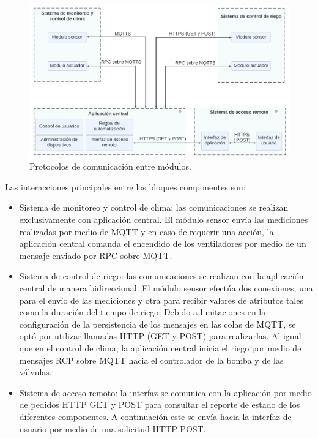 \begin{figure}[h]
	\centering
	\includegraphics[width=1.0\textwidth]{./Figures/blockproto2.jpg}
	\caption[Protocolos de comunicación entre módulos.]{Protocolos de comunicación entre módulos.}
	\label{fig:blockprotos}
\end{figure}


\pagebreak
Las interacciones principales entre los bloques componentes son:
 
 \begin{itemize}
	\item Sistema de monitoreo y control de clima: las comunicaciones se realizan exclusivamente con aplicación central.
	El módulo sensor envía las mediciones realizadas por medio de MQTT y en caso de requerir una acción, la aplicación central comanda el encendido de los ventiladores por medio de un mensaje enviado por RPC \citep{rfc1057} sobre MQTT.
	
	\item Sistema de control de riego: las comunicaciones se realizan con la aplicación central de manera bidireccional.
	El módulo sensor efectúa dos conexiones, una para el envío de las mediciones y otra para recibir valores de atributos tales como la duración del tiempo de riego. Debido a limitaciones en la configuración de la persistencia de los mensajes en las colas de MQTT, se optó por utilizar llamadas HTTP (GET y POST) para realizarlas.
	Al igual que en el control de clima, la aplicación central inicia el riego por medio de mensajes RCP sobre MQTT hacia el controlador de la bomba y de las válvulas.
	
	\item Sistema de acceso remoto: la interfaz se comunica con la aplicación por medio de pedidos HTTP GET y POST para consultar el reporte de estado de los diferentes componentes. A continuación este se envía hacia la interfaz de usuario por medio de una solicitud HTTP POST.
 
 
 
 
 \end{itemize}






